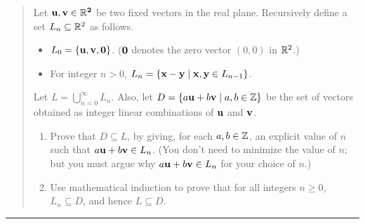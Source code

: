 \documentclass[11pt]{article}
\begin{document}


\begin{quote}
\newcommand{\bu}{\bf u}
\newcommand{\bv}{\bf v}
Let $\bu,\bv \in \R^2$ be two fixed vectors in the real plane.
Recursively define a set $L_n \subseteq \R^2$
as follows.
\begin{itemize}
\item $L_0 = \{\bu,\bv,{\bf 0}\}$. (${\bf 0}$ denotes the zero vector 
$(0,0)$ in $\R^2$.)
\item For integer $n > 0$, $L_n = \{ {\bf x}- {\bf y} \mid {\bf x}, {\bf y}
  \in L_{n-1} \}$.
\end{itemize}
Let $L = \bigcup_{n=0}^\infty L_n$. Also, let $D = \{ a{\bf u}+b{\bf
  v} \mid a,b \in \Z \}$ be the set of vectors obtained as integer
linear combinations of ${\bf u}$ and ${\bf v}$.
\begin{enumerate}
\item Prove that $D \subseteq L$, by giving, for each $a,b\in\Z$,
an explicit value of $n$ such that $a{\bf u}+b{\bf v}\in L_n$. 
(You don't need to
minimize the value of $n$; but you must argue why $a{\bf u}+b{\bf v} \in L_n$ for your
choice of $n$.)
\item Use mathematical induction to prove that for all integers $n\ge 0$,
$L_n \subseteq D$, and hence $L \subseteq D$.
\end{enumerate}
\end{quote}
\hrule
\end{document}
